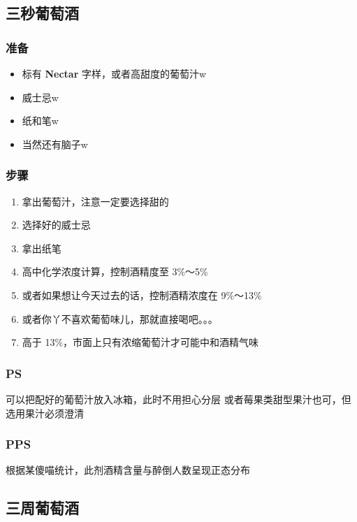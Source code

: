 \documentclass[12pt, a4paper]{ctexart}
\begin{document}
\subsection{三秒葡萄酒}
\subsubsection{准备}
\begin{itemize}
    \item{标有 \textbf{Nectar} 字样，或者高甜度的葡萄汁w}
    \item{威士忌w}
    \item{纸和笔w}
    \item{当然还有脑子w}
\end{itemize}

\subsubsection{步骤}
\begin{enumerate}[start=0]
    \item{拿出葡萄汁，注意一定要选择甜的}
    \item{选择好的威士忌}
    \item{拿出纸笔}
    \item{高中化学浓度计算，控制酒精度至 3\%～5\%}
    \item{或者如果想让今天过去的话，控制酒精浓度在 9\%～13\%}
    \item{或者你丫不喜欢葡萄味儿，那就直接喝吧。。。}
    \item{高于 13\%，市面上只有浓缩葡萄汁才可能中和酒精气味}
\end{enumerate}

\subsubsection{PS}
可以把配好的葡萄汁放入冰箱，此时不用担心分层
或者莓果类甜型果汁也可，但选用果汁必须澄清

\subsubsection{PPS}
根据某傻喵统计，此剂酒精含量与醉倒人数呈现正态分布

\subsection{三周葡萄酒}
\end{document}
